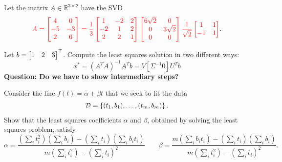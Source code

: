 \documentclass[10pt]{exam}
\newcommand{\R}{\mathbb{R}}
\newcommand{\changes}[1]{{\color{red} #1}}
\begin{document}
\begin{questions}
\question [10] Let the matrix $A \in \R^{3\times 2}$ have the SVD 
\[\changes{ A = \bmat{ 4 & 0 \\ -5 & -3 \\ 2 & 6} = \frac13\bmat{ 1 & -2 & 2 \\-2 & 1 & 2 \\ 2 & 2 & 1} \bmat{6\sqrt{2}  & 0 \\ 0 & 3\sqrt{2} \\ 0 & 0}  \frac{1}{\sqrt{2}}\bmat{ 1 & 1 \\ -1 & 1}}.\]

Let $b = \begin{bmatrix} 1 & 2 & 3 \end{bmatrix}^\top$. Compute the least squares solution in two different ways:
\\
\[x^* = (A^TA)^{-1}A^T b = V[\Sigma^{-1} 0]U^T b\]
\textbf{Question: Do we have to show intermediary steps?}


\pagebreak


\question [10] Consider the line $f(t) = \alpha + \beta t$ that we seek to fit the data 
\[ \mathcal{D} = \left\{ (t_1,b_1),\dots,(t_m,b_m)\right\}.\]
Show that the least squares coefficients $\alpha$ and $\beta$, obtained by solving the least squares problem, satisfy 
\[ \alpha = \frac{(\sum_i t_i^2 ) (\sum_i b_i) - (\sum_it_i)(\sum_i b_i t_i) }{m(\sum_it_i^2) - (\sum_i t_i)^2 }\qquad \beta = \frac{ m (\sum_i b_it_i) - (\sum_i t_i)(\sum_i b_i)}{m(\sum_it_i^2) - (\sum_i t_i)^2 }.\]


\end{questions}
\end{document}

